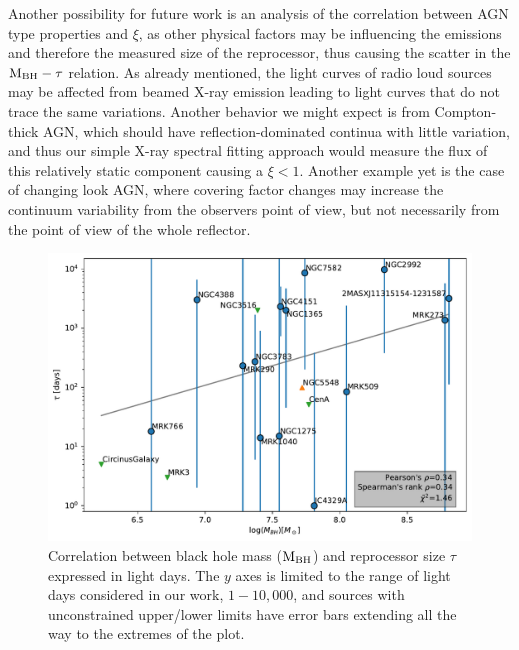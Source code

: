 
Another possibility for future work is an analysis of the correlation between AGN type properties and $\xi$, as other physical factors may be influencing the emissions and therefore the measured size of the reprocessor, thus causing the scatter in the ${\rm M}_{\rm BH} - \tau$ relation. As already mentioned, the light curves of radio loud sources may be affected from beamed X-ray emission leading to light curves that do not trace the same variations. Another behavior we might expect is from Compton-thick AGN, which should have reflection-dominated continua with little variation, and thus our simple X-ray spectral fitting approach would measure the flux of this relatively static component causing a $\xi<1$. Another example yet is the case of changing look AGN, where covering factor changes may increase the continuum variability from the observers point of view, but not necessarily from the point of view of the whole reflector.
\begin{figure}
\begin{center}
    {
  \includegraphics[width=\textwidth]{Figs/Chapter5/tau_mass_corr.pdf} \hfill 
  \caption{Correlation between black hole mass (${\rm M}_{\rm BH}$) and reprocessor size $\tau$ expressed in light days. The $y$ axes is limited to the range of light days considered in our work, $1-10,000$, and sources with unconstrained upper/lower limits have error bars extending all the way to the extremes of the plot.}
    \label{fig:tau_mass_corr}
  }
\end{center}
\end{figure}

